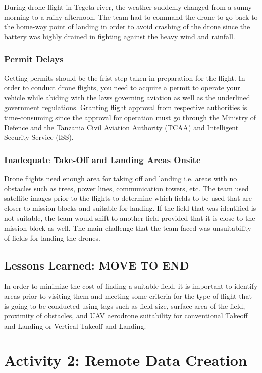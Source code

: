 \documentclass[a4paper,12pt,twoside]{article}
\begin{document}
        During drone flight in Tegeta river, the weather suddenly changed from a sunny morning to a rainy afternoon. The team had to command the drone to go back to the home-way point of landing in order to avoid crashing of the drone since the battery was highly drained in fighting against the heavy wind and rainfall.
    
    \subsubsection{Permit Delays}
        Getting permits should be the frist step taken in preparation for the flight. In order to conduct drone flights, you need to acquire a permit to operate your vehicle while abiding with the laws governing aviation as well as the underlined government regulations.  Granting flight approval from respective authorities is time-consuming since the approval for operation must go through the Ministry of Defence and the Tanzania Civil Aviation Authority (TCAA) and Intelligent Security Service (ISS).
     
     \subsubsection{Inadequate Take-Off and Landing Areas Onsite}
         Drone flights need enough area for taking off and landing i.e. areas with no obstacles such as trees, power lines, communication towers, etc. The team used satellite images prior to the flights to determine which fields to be used that are closer to mission blocks and suitable for landing. If the field that was identified is not suitable, the team would shift to another field provided that it is close to the mission block as well. The main challenge that the team faced was unsuitability of fields for landing the drones.
     
\subsection{Lessons Learned: MOVE TO END}
    In order to minimize the cost of finding a suitable field, it is important to identify areas prior to visiting them and meeting some criteria for the type of flight that is going to be conducted using tags such as field size, surface area of the field, proximity of obstacles, and UAV aerodrone suitability for conventional Takeoff and Landing or Vertical Takeoff and Landing.
    
\section{Activity 2: Remote Data Creation}
\end{document}

